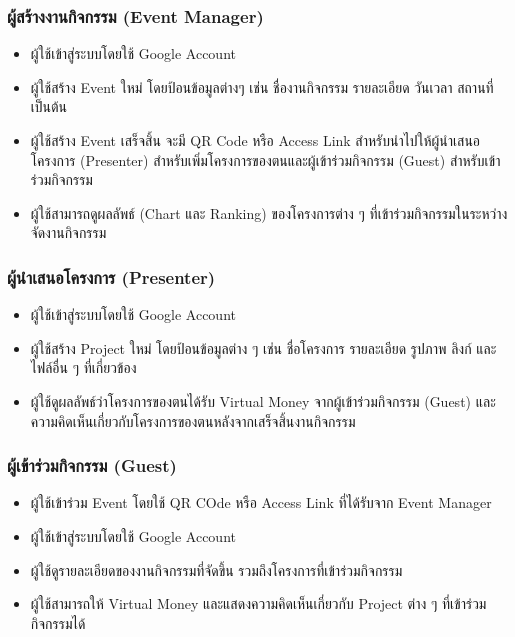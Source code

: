 \subsubsection{ผู้สร้างงานกิจกรรม (Event Manager)}
\begin{itemize}
    \item ผู้ใช้เข้าสู่ระบบโดยใช้ Google Account
    \item ผู้ใช้สร้าง Event ใหม่ โดยป้อนข้อมูลต่างๆ เช่น ชื่องานกิจกรรม รายละเอียด วันเวลา สถานที่ เป็นต้น
    \item ผู้ใช้สร้าง Event เสร็จสิ้น จะมี QR Code หรือ Access Link สำหรับนำไปให้ผู้นำเสนอโครงการ (Presenter) สำหรับเพิ่มโครงการของตนและผู้เข้าร่วมกิจกรรม (Guest) สำหรับเข้าร่วมกิจกรรม
    \item ผู้ใช้สามารถดูผลลัพธ์ (Chart และ Ranking) ของโครงการต่าง ๆ ที่เข้าร่วมกิจกรรมในระหว่างจัดงานกิจกรรม

\end{itemize}

\subsubsection{ผู้นำเสนอโครงการ (Presenter)}
\begin{itemize}
    \item ผู้ใช้เข้าสู่ระบบโดยใช้ Google Account
    \item ผู้ใช้สร้าง Project ใหม่ โดยป้อนข้อมูลต่าง ๆ เช่น ชื่อโครงการ รายละเอียด รูปภาพ ลิงก์ และไฟล์อื่น ๆ ที่เกี่ยวข้อง
    \item ผู้ใช้ดูผลลัพธ์ว่าโครงการของตนได้รับ Virtual Money จากผู้เข้าร่วมกิจกรรม (Guest) และความคิดเห็นเกี่ยวกับโครงการของตนหลังจากเสร็จสิ้นงานกิจกรรม

\end{itemize}

\subsubsection{ผู้เข้าร่วมกิจกรรม (Guest)}
\begin{itemize}
    \item ผู้ใช้เข้าร่วม Event โดยใช้ QR COde หรือ Access Link ที่ได้รับจาก Event Manager
    \item ผู้ใช้เข้าสู่ระบบโดยใช้ Google Account
    \item ผู้ใช้ดูรายละเอียดของงานกิจกรรมที่จัดขึ้น รวมถึงโครงการที่เข้าร่วมกิจกรรม
    \item ผู้ใช้สามารถให้ Virtual Money และแสดงความคิดเห็นเกี่ยวกับ Project ต่าง ๆ ที่เข้าร่วมกิจกรรมได้
\end{itemize}

